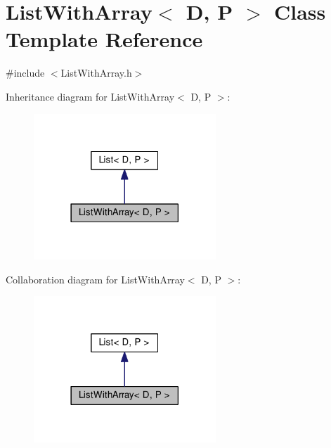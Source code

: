 \hypertarget{classListWithArray}{}\section{List\+With\+Array$<$ D, P $>$ Class Template Reference}
\label{classListWithArray}


{\ttfamily \#include $<$List\+With\+Array.\+h$>$}



Inheritance diagram for List\+With\+Array$<$ D, P $>$\+:
\nopagebreak
\begin{figure}[H]
\begin{center}
\leavevmode
\includegraphics[width=194pt]{classListWithArray__inherit__graph}
\end{center}
\end{figure}


Collaboration diagram for List\+With\+Array$<$ D, P $>$\+:
\nopagebreak
\begin{figure}[H]
\begin{center}
\leavevmode
\includegraphics[width=194pt]{classListWithArray__coll__graph}
\end{center}
\end{figure}
